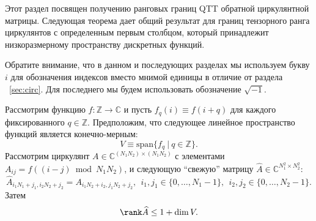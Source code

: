 Этот раздел посвящен получению ранговых границ QTT обратной циркулянтной матрицы.
Следующая теорема дает общий результат для границ тензорного ранга циркулянтов с определенным первым столбцом, который принадлежит низкоразмерному пространству дискретных функций.

Обратите внимание, что в данном и последующих разделах мы используем букву $i$ для обозначения индексов вместо мнимой единицы в отличие от раздела ~\ref{sec:circ}.
Для последнего мы будем использовать обозначение $\sqrt{-1}$.

\begin{theorem}\label{thm:qtt-rank-general}
	Рассмотрим функцию $f: \mathbb{Z} \to \mathbb{C}$ и пусть $f_q(i) \equiv f(i+q)$ для каждого фиксированного $q \in \mathbb{Z}$.
	Предположим, что следующее линейное пространство функций является конечно-мерным:
	\[
	V \equiv \mathrm{span}\{f_q~|~q \in \mathbb{Z}\}.
	\]
	Рассмотрим циркулянт $A \in \mathbb{C}^{(N_1N_2) \times (N_1N_2)}$ с элементами $A_{ij} = f((i-j) \bmod N_1N_2)$, и следующую ``свежую'' матрицу $\widehat{A} \in \mathbb{C}^{N_1^2 \times N_2^2}$:
	\[
	\widehat{A}_{i_1N_1 + j_1, i_2N_2 + j_2} = A_{i_1N_2 + i_2,j_1N_2 + j_2},~~ i_1, j_1 \in \{0, \dots, N_1-1\},~~i_2, j_2 \in \{0, \dots, N_2-1\}.
	\]
	Затем
	\[
	\rank \widehat{A} \le 1 + \dim V.
	\]
\end{theorem}
